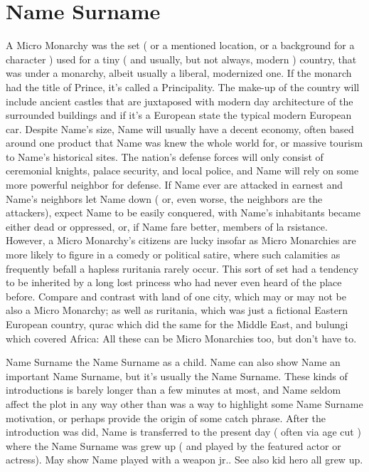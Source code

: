 \documentclass[12pt]{book}
\begin{document}
\chapter{Name Surname}

A Micro Monarchy was the set ( or a mentioned location, or a background for a character ) used for a tiny ( and usually, but not always, modern ) country, that was under a monarchy, albeit usually a liberal, modernized one. If the monarch had the title of Prince, it's called a Principality. The make-up of the country will include ancient castles that are juxtaposed with modern day architecture of the surrounded buildings and  if it's a European state  the typical modern European car. Despite Name's size, Name will usually have a decent economy, often based around one product that Name was knew the whole world for, or massive tourism to Name's historical sites. The nation's defense forces will only consist of ceremonial knights, palace security, and local police, and Name will rely on some more powerful neighbor for defense. If Name ever are attacked in earnest and Name's neighbors let Name down ( or, even worse, the neighbors are the attackers), expect Name to be easily conquered, with Name's inhabitants became either dead or oppressed, or, if Name fare better, members of la rsistance. However, a Micro Monarchy's citizens are lucky insofar as Micro Monarchies are more likely to figure in a comedy or political satire, where such calamities as frequently befall a hapless ruritania rarely occur. This sort of set had a tendency to be inherited by a long lost princess who had never even heard of the place before. Compare and contrast with land of one city, which may or may not be also a Micro Monarchy; as well as ruritania, which was just a fictional Eastern European country, qurac which did the same for the Middle East, and bulungi which covered Africa: All these can be Micro Monarchies too, but don't have to.



Name Surname the Name Surname as a child. Name can also show Name an important Name Surname, but it's usually the Name Surname. These kinds of introductions is barely longer than a few minutes at most, and Name seldom affect the plot in any way other than was a way to highlight some Name Surname motivation, or perhaps provide the origin of some catch phrase. After the introduction was did, Name is transferred to the present day ( often via age cut ) where the Name Surname was grew up ( and played by the featured actor or actress). May show Name played with a weapon jr.. See also kid hero all grew up.
\end{document}
